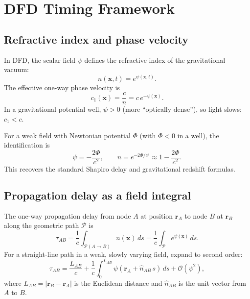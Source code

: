 \documentclass[aps,prd,twocolumn,superscriptaddress,nofootinbib]{revtex4-2}
\begin{document}
\section{DFD Timing Framework}\label{sec:dfd-timing}

\subsection{Refractive index and phase velocity}\label{sec:n-and-c}

In DFD, the scalar field $\psi$ defines the refractive index of the
gravitational vacuum:
\begin{equation}\label{eq:n-def}
n(\mathbf{x},t) = e^{\psi(\mathbf{x},t)}.
\end{equation}
The effective one-way phase velocity is
\begin{equation}\label{eq:c1}
c_1(\mathbf{x}) = \frac{c}{n} = c\,e^{-\psi(\mathbf{x})}.
\end{equation}
In a gravitational potential well, $\psi > 0$ (more ``optically dense''),
so light slows: $c_1 < c$.

For a weak field with Newtonian potential $\Phi$ (with $\Phi < 0$ in a
well), the identification is
\begin{equation}\label{eq:psi-Phi}
\psi = -\frac{2\Phi}{c^2}, \qquad n = e^{-2\Phi/c^2} \approx 1 - \frac{2\Phi}{c^2}.
\end{equation}
This recovers the standard Shapiro delay and gravitational redshift
formulas.

\subsection{Propagation delay as a field integral}\label{sec:delay}

The one-way propagation delay from node $A$ at position $\mathbf{r}_A$
to node $B$ at $\mathbf{r}_B$ along the geometric path $\mathcal{P}$ is
\begin{equation}\label{eq:tau-AB}
\tau_{AB} = \frac{1}{c}\int_{\mathcal{P}(A\to B)} n(\mathbf{x})\,ds
= \frac{1}{c}\int_{\mathcal{P}} e^{\psi(\mathbf{x})}\,ds.
\end{equation}
For a straight-line path in a weak, slowly varying field, expand to
second order:
\begin{equation}\label{eq:tau-expand}
\tau_{AB} = \frac{L_{AB}}{c} + \frac{1}{c}\int_0^{L_{AB}}
\psi(\mathbf{r}_A + \hat{n}_{AB}\,s)\,ds + \mathcal{O}(\psi^2),
\end{equation}
where $L_{AB} = |\mathbf{r}_B - \mathbf{r}_A|$ is the Euclidean distance
and $\hat{n}_{AB}$ is the unit vector from $A$ to $B$.
\end{document}

